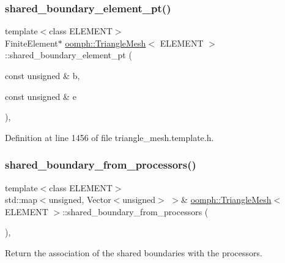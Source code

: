 \subsubsection{\texorpdfstring{shared\+\_\+boundary\+\_\+element\+\_\+pt()}{shared\_boundary\_element\_pt()}}
{\footnotesize\ttfamily template$<$class E\+L\+E\+M\+E\+NT$>$ \\
Finite\+Element$\ast$ \hyperlink{classoomph_1_1TriangleMesh}{oomph\+::\+Triangle\+Mesh}$<$ E\+L\+E\+M\+E\+NT $>$\+::shared\+\_\+boundary\+\_\+element\+\_\+pt (\begin{DoxyParamCaption}\item[{const unsigned \&}]{b,  }\item[{const unsigned \&}]{e }\end{DoxyParamCaption})\hspace{0.3cm}{\ttfamily [inline]}, {\ttfamily [protected]}}



Definition at line 1456 of file triangle\+\_\+mesh.\+template.\+h.

\mbox{\label{classoomph_1_1TriangleMesh_a10c5d3db04d6bd99b16485ff40a7bda2}} 
\subsubsection{\texorpdfstring{shared\+\_\+boundary\+\_\+from\+\_\+processors()}{shared\_boundary\_from\_processors()}\hspace{0.1cm}{\footnotesize\ttfamily [1/2]}}
{\footnotesize\ttfamily template$<$class E\+L\+E\+M\+E\+NT$>$ \\
std\+::map$<$unsigned, Vector$<$unsigned$>$ $>$\& \hyperlink{classoomph_1_1TriangleMesh}{oomph\+::\+Triangle\+Mesh}$<$ E\+L\+E\+M\+E\+NT $>$\+::shared\+\_\+boundary\+\_\+from\+\_\+processors (\begin{DoxyParamCaption}{ }\end{DoxyParamCaption})\hspace{0.3cm}{\ttfamily [inline]}, {\ttfamily [protected]}}



Return the association of the shared boundaries with the processors. 



